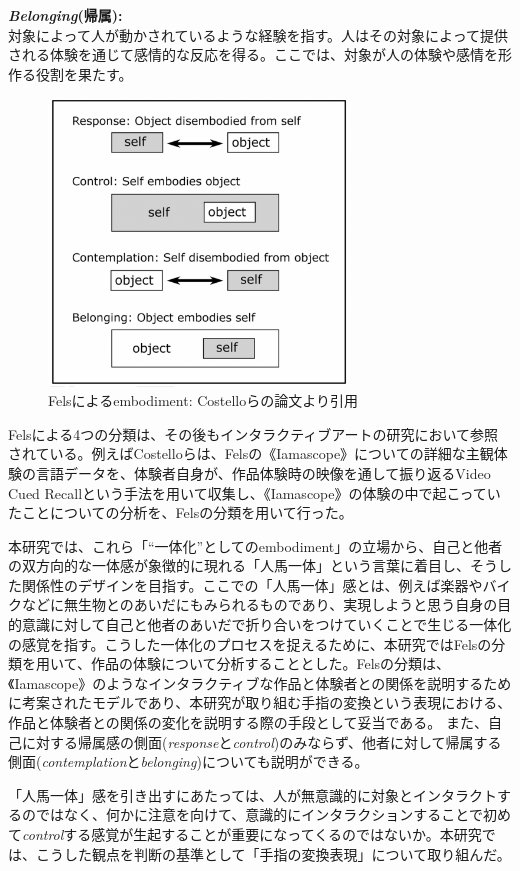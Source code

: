 \textbf{\textit{Belonging}(帰属):}\\
対象によって人が動かされているような経験を指す。人はその対象によって提供される体験を通じて感情的な反応を得る。ここでは、対象が人の体験や感情を形作る役割を果たす。

\begin{figure}[H]
  \centering
  \includegraphics[width=8cm]{img/fels_diagram.png}
  \caption{Felsによるembodiment: Costelloらの論文より引用}
  \label{fig:fels_embodiment}
\end{figure}

Felsによる4つの分類は、その後もインタラクティブアートの研究において参照されている。例えばCostelloらは、Felsの《Iamascope》についての詳細な主観体験の言語データを、体験者自身が、作品体験時の映像を通して振り返るVideo Cued Recallという手法を用いて収集し、《Iamascope》の体験の中で起こっていたことについての分析を、Felsの分類を用いて行った。

本研究では、これら「``一体化''としてのembodiment」の立場から、自己と他者の双方向的な一体感が象徴的に現れる「人馬一体」という言葉に着目し、そうした関係性のデザインを目指す。ここでの「人馬一体」感とは、例えば楽器やバイクなどに無生物とのあいだにもみられるものであり、実現しようと思う自身の目的意識に対して自己と他者のあいだで折り合いをつけていくことで生じる一体化の感覚を指す。こうした一体化のプロセスを捉えるために、本研究ではFelsの分類を用いて、作品の体験について分析することとした。Felsの分類は、《Iamascope》のようなインタラクティブな作品と体験者との関係を説明するために考案されたモデルであり、本研究が取り組む手指の変換という表現における、作品と体験者との関係の変化を説明する際の手段として妥当である。
また、自己に対する帰属感の側面(\textit{response}と\textit{control})のみならず、他者に対して帰属する側面(\textit{contemplation}と\textit{belonging})についても説明ができる。

「人馬一体」感を引き出すにあたっては、人が無意識的に対象とインタラクトするのではなく、何かに注意を向けて、意識的にインタラクションすることで初めて\textit{control}する感覚が生起することが重要になってくるのではないか。本研究では、こうした観点を判断の基準として「手指の変換表現」について取り組んだ。